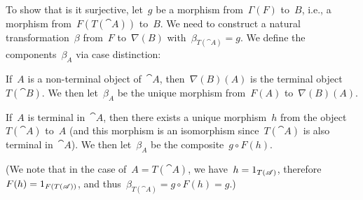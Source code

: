 To show that is it surjective, let~$g$ be a morphism from~$Γ(F)$ to~$B$, i.e., a morphism from~$F(T(\cat{A}))$ to~$B$.
We need to construct a natural transformation~$β$ from~$F$ to~$∇(B)$ with~$β_{T(\cat{A})} = g$.
We define the components~$β_A$ via case distinction:
\begin{casedistinction}

	\item
		If~$A$ is a non-terminal object of~$\cat{A}$, then~$∇(B)(A)$ is the terminal object~$T(\cat{B})$.
		We then let~$β_A$ be the unique morphism from~$F(A)$ to~$∇(B)(A)$.

	\item
		If~$A$ is terminal in~$\cat{A}$, then there exists a unique morphism~$h$ from the object~$T(\cat{A})$ to~$A$ (and this morphism is an isomorphism since~$T(\cat{A})$ is also terminal in~$\cat{A}$).
		We then let~$β_A$ be the composite~$g ∘ F(h)$.

		(We note that in the case of~$A = T(\cat{A})$, we have~$h = 1_{T(\mathscr{A})}$, therefore~$F(h) = 1_{F(T(\mathscr{A}))}$, and thus~$β_{T(\cat{A})} = g ∘ F(h) = g$.)
\end{casedistinction}


